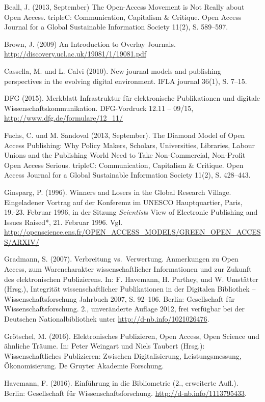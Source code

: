 \documentclass[a4paper,
fontsize=11pt,
oneside,
numbers=noperiodatend,
parskip=half-,
bibliography=totoc,
final
]{scrartcl}
\begin{document}
Beall, J. (2013, September) The Open-Access Movement is Not Really about
Open Access. tripleC: Communication, Capitalism \& Critique. Open Access
Journal for a Global Sustainable Information Society 11(2), S. 589--597.

Brown, J. (2009) An Introduction to Overlay Journals.
\url{http://discovery.ucl.ac.uk/19081/1/19081.pdf}

Cassella, M. und L. Calvi (2010). New journal models and publishing
perspectives in the evolving digital environment. IFLA journal 36(1), S.
7--15.

DFG (2015). Merkblatt Infrastruktur für elektronische Publikationen und
digitale Wissenschaftskommunikation. DFG-Vordruck 12.11 -- 09/15,
\url{http://www.dfg.de/formulare/12_11/}

Fuchs, C. und M. Sandoval (2013, September). The Diamond Model of Open
Access Publishing: Why Policy Makers, Scholars, Universities, Libraries,
Labour Unions and the Publishing World Need to Take Non-Commercial,
Non-Profit Open Access Serious. tripleC: Communication, Capitalism \&
Critique. Open Access Journal for a Global Sustainable Information
Society 11(2), S. 428--443.

Ginsparg, P. (1996). Winners and Losers in the Global Research Village.
Eingeladener Vortrag auf der Konferemz im UNESCO Hauptquartier, Paris,
19.-23. Februar 1996, in der Sitzung \emph{Scientist}s View of
Electronic Publishing and Issues Raised*, 21. Februar 1996. Vgl.
\url{http://openscience.ens.fr/OPEN_ACCESS_MODELS/GREEN_OPEN_ACCESS/ARXIV/}

Gradmann, S. (2007). Verbreitung vs.~Verwertung. Anmerkungen zu Open
Access, zum Warencharakter wissenschaftlicher Informationen und zur
Zukunft des elektronischen Publizierens. In: F. Havemann, H. Parthey,
und W. Umstätter (Hrsg.), Integrität wissenschaftlicher Publikationen in
der Digitalen Bibliothek -- Wissenschaftsforschung Jahrbuch 2007, S.
92--106. Berlin: Gesellschaft für Wissenschaftsforschung. 2.,
unveränderte Auflage 2012, frei verfügbar bei der Deutschen
Nationalbibliothek unter \url{http://d-nb.info/1021026476}.

Grötschel, M. (2016). Elektronisches Publizieren, Open Access, Open
Science und ähnliche Träume. In: Peter Weingart und Niels Taubert
(Hrsg.): Wissenschaftliches Publizieren: Zwischen Digitalisierung,
Leistungsmessung, Ökonomisierung. De Gruyter Akademie Forschung.

Havemann, F. (2016). Einführung in die Bibliometrie (2., erweiterte
Aufl.). Berlin: Gesellschaft für Wissenschaftsforschung.
\url{http://d-nb.info/1113795433}.
\end{document}

